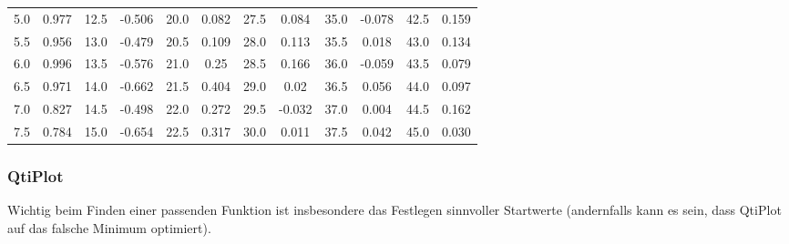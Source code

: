 \begin{center}
\begin{tabular}{*{12}{c}}
        5.0     & 0.977     & 12.5      & -0.506    & 20.0     & 0.082      & 27.5      & 0.084     & 35.0      & -0.078    & 42.5      & 0.159   \\
        5.5     & 0.956     & 13.0      & -0.479    & 20.5     & 0.109      & 28.0      & 0.113     & 35.5      & 0.018     & 43.0      & 0.134   \\
        6.0     & 0.996     & 13.5      & -0.576    & 21.0     & 0.25       & 28.5      & 0.166     & 36.0      & -0.059    & 43.5      & 0.079   \\
        6.5     & 0.971     & 14.0      & -0.662    & 21.5     & 0.404      & 29.0      & 0.02      & 36.5      & 0.056     & 44.0      & 0.097   \\
        7.0     & 0.827     & 14.5      & -0.498    & 22.0     & 0.272      & 29.5      & -0.032    & 37.0      & 0.004     & 44.5      & 0.162   \\
        7.5     & 0.784     & 15.0      & -0.654    & 22.5     & 0.317      & 30.0      & 0.011     & 37.5      & 0.042     & 45.0      & 0.030   \\
        \bottomrule
    \end{tabular}
\end{center}

\subsubsection{QtiPlot}

Wichtig beim  Finden einer passenden  Funktion ist insbesondere  das Festlegen
sinnvoller Startwerte (andernfalls kann es  sein, dass QtiPlot auf das falsche
Minimum optimiert).

